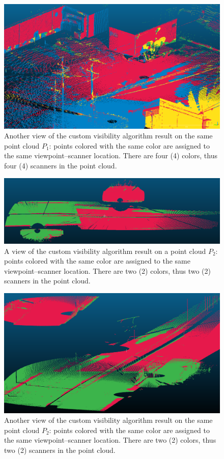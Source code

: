 \begin{figure}[h]
  \centering
  \includegraphics[scale=0.35]{img/custom-result2.png}
  \caption{Another view of the custom visibility algorithm result on the same point cloud $P_1$: points colored with the same color are assigned to the same viewpoint--scanner location. There are four (4) colors, thus four (4) scanners in the point cloud.}
  \label{fig:custom-result2}
\end{figure}
\begin{figure}[h]
  \centering
  \includegraphics[scale=0.35]{img/custom-result3.png}
  \caption{A view of the custom visibility algorithm result on a point cloud $P_2$: points colored with the same color are assigned to the same viewpoint--scanner location. There are two (2) colors, thus two (2) scanners in the point cloud.}
  \label{fig:custom-result3}
\end{figure}
\begin{figure}[h]
  \centering
  \includegraphics[scale=0.35]{img/custom-result4.png}
  \caption{Another view of the custom visibility algorithm result on the same point cloud $P_2$: points colored with the same color are assigned to the same viewpoint--scanner location. There are two (2) colors, thus two (2) scanners in the point cloud.}
  \label{fig:custom-result4}
\end{figure}
